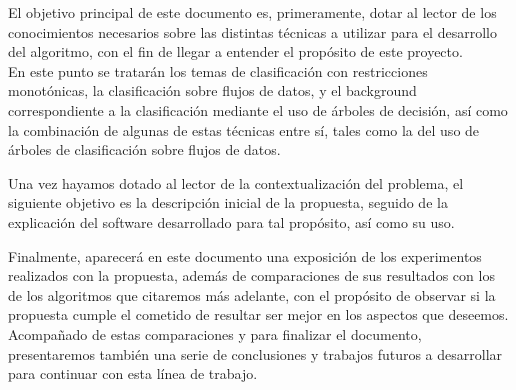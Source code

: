 El objetivo principal de este documento es, primeramente, dotar al lector de los conocimientos necesarios sobre las distintas técnicas a utilizar para el desarrollo del algoritmo, con el fin de llegar a entender el propósito de este proyecto.\\
En este punto se tratarán los temas de clasificación con restricciones monotónicas, la clasificación sobre flujos de datos, y el background correspondiente a la clasificación mediante el uso de árboles de decisión, así como la combinación de algunas de estas técnicas entre sí, tales como la del uso de árboles de clasificación sobre flujos de datos.

Una vez hayamos dotado al lector de la contextualización del problema, el siguiente objetivo es la descripción inicial de la propuesta, seguido de la explicación del software desarrollado para tal propósito, así como su uso.

Finalmente, aparecerá en este documento una exposición de los experimentos realizados con la propuesta, además de comparaciones de sus resultados con los de los algoritmos que citaremos más adelante, con el propósito de observar si la propuesta cumple el cometido de resultar ser mejor en los aspectos que deseemos.\\
Acompañado de estas comparaciones y para finalizar el documento, presentaremos también una serie de conclusiones y trabajos futuros a desarrollar para continuar con esta línea de trabajo.

\newpage

